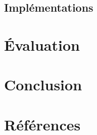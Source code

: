 \documentclass{rapport}
\begin{document}
\subsection{Implémentations}
\label{implé}

\newpage
\section{Évaluation}
\label{éval}

\newpage
\section{Conclusion}
\label{conclu}

\newpage
\section{Références} 



\newpage
\listoffigures

\newpage
\listoftables
\end{document}
